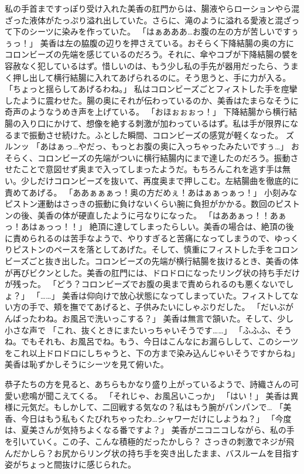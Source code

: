 私の手首まですっぽり受け入れた美香の肛門からは、腸液やらローションやら混ざった液体がたっぷり溢れ出していた。さらに、滝のように溢れる愛液と混ざって下のシーツに染みを作っていた。
「はぁあああ…お腹の左の方が苦しいですぅぅっ！」
美香は左の脇腹の辺りを押さえている。おそらく下降結腸の奥の方にコロンビーズの先端を感じているのだろう。それに、傘やコブが下降結腸の襞を容赦なく犯しているはず。惜しいのは、もう少し私の手先が器用だったら、うまく押し出して横行結腸に入れてあげられるのに。そう思うと、手に力が入る。
「ちょっと揺らしてあげるわね。」
私はコロンビーズごとフィストした手を痙攣したように震わせた。腸の奥にそれが伝わっているのか、美香はたまらなそうに奇声のようなうめき声を上げている。
「おほぉぉぉっ！」
下降結腸から横行結腸の入り口にかけて、想像を絶する刺激が加わっているはず。私は手が限界になるまで振動させ続けた。ふとした瞬間、コロンビーズの感覚が軽くなった。
ズルンッ
「あはぁっ…やだっ、もっとお腹の奥に入っちゃったみたいですぅ…」
おそらく、コロンビーズの先端がついに横行結腸内にまで達したのだろう。振動させたことで意図せず奥まで入ってしまったようだ。もちろんこれを逃す手は無い。少しだけコロンビーズを抜いて、再度奥まで押しこむ。左結腸曲を徹底的に責めてあげる。
「ああぁぁぁっ！奥の方だめぇ！あはぁぁっぁっ！」
小刻みなピストン運動はさっきの振動に負けないくらい腕に負担がかかる。数回のピストンの後、美香の体が硬直したように弓なりになった。
「はああぁっ！！あぁっ！あはぁっっ！！」
絶頂に達してしまったらしい。美香の場合は、絶頂の後に責められるのは苦手なようで、やりすぎると苦痛になってしまうので、ゆっくりピストンのペースを落としてあげた。そして、慎重にフィストした手をコロンビーズごと抜き出した。コロンビーズの先端が横行結腸を抜けるとき、美香の体が再びビクンとした。美香の肛門には、ドロドロになったリング状の持ち手だけが残った。
「どう？コロンビーズでお腹の奥まで責められるのも悪くないでしょ？」
「……」
美香は仰向けで放心状態になってしまっていた。フィストしてない方の手で、頬を撫でてあげると、子供みたいにしゃぶりだした。
「だいぶがんばったわね。お風呂で洗いっこする？」
美香は無言で頷いた。そして、少し小さな声で
「これ、抜くときにまたいっちゃいそうです……」
「ふふふ、そうね。でもそれも、お風呂でね。もう、今日はこんなにお漏らしして、このシーツをこれ以上ドロドロにしちゃうと、下の方まで染み込んじゃいそうですからね」
美香は恥ずかしそうにシーツを見て俯いた。

恭子たちの方を見ると、あちらもかなり盛り上がっているようで、詩織さんの可愛い悲鳴が聞こえてくる。
「それじゃ、お風呂いこっか」
「はい！」
美香は異様に元気だ。もしかして、二回戦する気なの？私はもう腕がパンパンで…
「美香、今日はもう私もくたびれちゃったわ…シャワーだけにしようね？」
「今度は、夏美さんが気持ちよくなる番ですよ？」
美香がニコニコしながら、私の手を引いていく。この子、こんな積極的だったかしら？
さっきの刺激でネジが飛んだかしら？お尻からリング状の持ち手を突き出したまま、バスルームを目指す姿がちょっと間抜けに感じられた。


